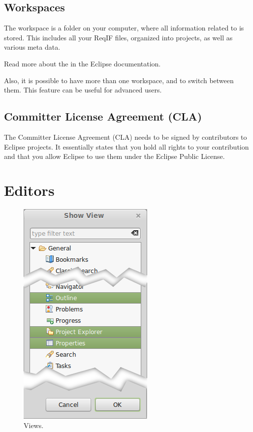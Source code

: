 \subsection{Workspaces}
\label{sec:workspaces}

The workspace is a folder on your computer, where all information related to \pror{} is stored.  This includes all your ReqIF files, organized into projects, as well as various meta data.

\begin{info}
Read more about the  in the Eclipse documentation.

Also, it is possible to have more than one workspace, and to switch between them.  This feature can be useful for advanced users.
\end{info}

\subsection{Committer License Agreement (CLA)}

The Committer License Agreement (CLA) needs to be signed by contributors to Eclipse projects.  It essentially states that you hold all rights to your contribution and that you allow Eclipse to use them under the Eclipse Public License.

\section{Editors}

\begin{figure}
\centering
\includegraphics[width=.3\textwidth]{../rmf-images/views_highlighted.png}
\caption{Views.}
\label{fig:Views}
\end{figure}

